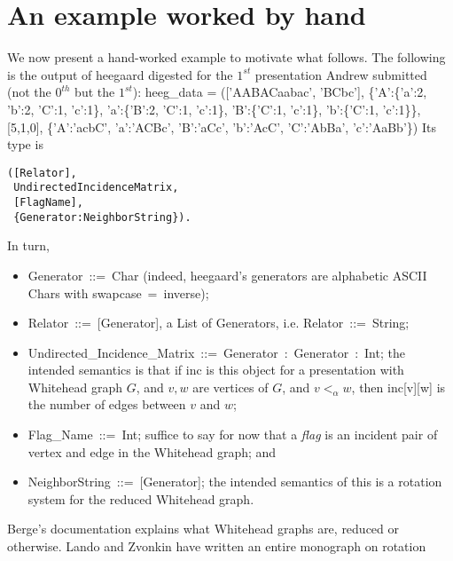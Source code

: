 \documentclass{article}%
\theoremstyle{plain}
\theoremstyle{plain}
\theoremstyle{definition}
\numberwithin{equation}{section}
\begin{document}
\section{An example worked by hand}
We now present a hand-worked example to motivate what follows.
The following is the output of {\Tt{}heegaard\nwendquote} digested for the $1^{st}$
presentation Andrew submitted (not the $0^{th}$ but the $1^{st}$):
\nwenddocs{}\endmoddef\nwstartdeflinemarkup\nwenddeflinemarkup
heeg_data =
(['AABACaabac', 'BCbc'],
 \{'A':\{'a':2, 'b':2, 'C':1, 'c':1\},
  'a':\{'B':2, 'C':1, 'c':1\},
  'B':\{'C':1, 'c':1\},
  'b':\{'C':1, 'c':1\}\},
 [5,1,0],
 \{'A':'acbC',
  'a':'ACBc',
  'B':'aCc',
  'b':'AcC',
  'C':'AbBa',
  'c':'AaBb'\})
\nwendcode{}\nwdocspar
Its type is
\begin{verbatim}
([Relator],
 UndirectedIncidenceMatrix,
 [FlagName],
 {Generator:NeighborString}).
\end{verbatim}
\nwenddocs{}\nwdocspar
In turn,
\begin{itemize}
\item {\Tt{}Generator\ ::=\ Char\nwendquote} (indeed, {\Tt{}heegaard\nwendquote}'s
      generators are alphabetic ASCII {\Tt{}Char\nwendquote}s with
      {\Tt{}swapcase\ =\ inverse\nwendquote});
\item {\Tt{}Relator\ ::=\ [Generator]\nwendquote}, a {\Tt{}List\nwendquote} of {\Tt{}Generator\nwendquote}s,
      i.e. {\Tt{}Relator\ ::=\ String\nwendquote};
\item {\Tt{}Undirected{\_}Incidence{\_}Matrix\ ::=\ {\nwlbrace}Generator\ :\ {\nwlbrace}Generator\ :\ Int{\nwrbrace}{\nwrbrace}\nwendquote};
      the intended semantics is that if {\Tt{}inc\nwendquote} is this object for
      a presentation with Whitehead graph $G$, and $v,w$ are vertices of
      $G$, and $v <_{\alpha} w$, then {\Tt{}inc[v][w]\nwendquote} is the number of edges
      between $v$ and $w$;
\item {\Tt{}Flag{\_}Name\ ::=\ Int\nwendquote}; suffice to say for now that a \emph{flag}
      is an incident pair of vertex and edge in the Whitehead graph; and
\item {\Tt{}NeighborString\ ::=\ [Generator]\nwendquote}; the intended semantics of this is
      a rotation system for the reduced Whitehead graph.
\end{itemize}
\nwenddocs{}\nwdocspar
Berge's documentation \cite{heeg}
explains what Whitehead graphs are, reduced or otherwise.
Lando and Zvonkin have written an entire monograph \cite{LZ} on rotation
\end{document}
